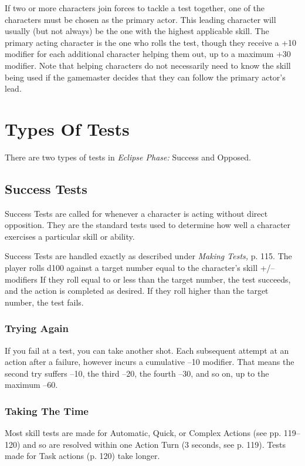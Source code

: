 If two or more characters join forces to tackle a test 
together, one of the characters must be chosen as the 
primary actor. This leading character will usually (but 
not always) be the one with the highest applicable 
skill. The primary acting character is the one who 
rolls the test, though they receive a +10 modifier for 
each additional character helping them out, up to a 
maximum +30 modifier. Note that helping characters 
do not necessarily need to know the skill being used 
if the gamemaster decides that they can follow the 
primary actor's lead.

\section{Types Of Tests}

There are two types of tests in \textit{Eclipse Phase:} Success 
and Opposed.

\subsection{Success Tests}

Success Tests are called for whenever a character is 
acting without direct opposition. They are the standard
tests used to determine how well a character
exercises a particular skill or ability.

Success Tests are handled exactly as described under 
\textit{Making Tests,} p. 115. The player rolls d100 against a 
target number equal to the character's skill +/– modifiers
If they roll equal to or less than the target number,
the test succeeds, and the action is completed as desired. 
If they roll higher than the target number, the test fails.

\subsubsection{Trying Again}

If you fail at a test, you can take another shot. Each 
subsequent attempt at an action after a failure, however
incurs a cumulative –10 modifier. That means the
second try suffers –10, the third –20, the fourth –30, 
and so on, up to the maximum –60.

\subsubsection{Taking The Time}

Most skill tests are made for Automatic, Quick, or 
Complex Actions (see pp. 119–120) and so are resolved
within one Action Turn (3 seconds, see p. 119).
Tests made for Task actions (p. 120) take longer.

